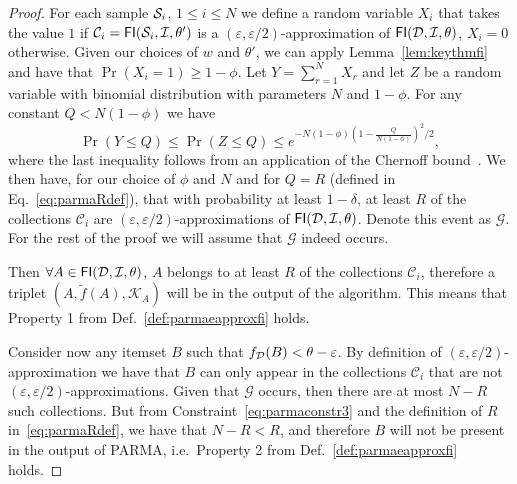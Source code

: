 \begin{proof}
  For each sample ${\cal S}_i$, $1\le i\le N$ we define a random variable $X_i$ that
  takes the value $1$ if $\mathcal{C}_i=\mathsf{FI}({\cal S}_i,{\cal I},\theta')$ is a
  $(\varepsilon,\varepsilon/2)$-approximation of $\mathsf{FI}({\cal D},{\cal I},\theta)$, $X_i=0$
  otherwise. Given our choices of $w$ and $\theta'$, we can apply
  Lemma~\ref{lem:keythmfi} and have that $\Pr(X_i=1)\ge 1-\phi$. Let
  $Y=\sum_{r=1}^N X_r$ and let $Z$ be a random variable with binomial
  distribution with parameters $N$ and $1-\phi$. For any constant $Q<N(1-\phi)$ we have
  \[
  \Pr(Y\le Q)\le\Pr(Z\le Q)\le e^{-N(1-\phi)(1-\frac{Q}{N(1-\phi)})^2/2},
  \]
  where the last inequality follows from an application of the Chernoff
  bound~\cite[Chap.~4]{MitzenmacherU05}.
  We then have, for our choice of $\phi$ and $N$ and for $Q=R$
  (defined in Eq.~\eqref{eq:parmaRdef}), that with probability at least $1-\delta$,
  at least $R$ of the collections $\mathcal{C}_i$ are
  $(\varepsilon,\varepsilon/2)$-approximations of $\mathsf{FI}({\cal D},{\cal I},\theta)$. Denote
  this event as $\mathcal{G}$. For the rest of the proof we will assume that
  $\mathcal{G}$ indeed occurs.

  Then $\forall A\in\mathsf{FI}({\cal D},{\cal I},\theta)$, $A$ belongs to at least $R$ of the
  collections $\mathcal{C}_i$, therefore a triplet
  $(A,\tilde{f}(A),\mathcal{K}_A)$ will be in the output of the algorithm. This
  means that Property 1 from Def.~\ref{def:parmaeapproxfi} holds. 

  Consider now any itemset $B$ such that $f_{\cal D}(B)<\theta-\varepsilon$. By
  definition of $(\varepsilon,\varepsilon/2)$-approximation we have that $B$ can
  only appear in the collections $\mathcal{C}_i$ that are not
  $(\varepsilon,\varepsilon/2)$-approximations. Given
  that $\mathcal{G}$ occurs, then there are at most  $N-R$ such collections. But
  from Constraint~\eqref{eq:parmaconstr3} and the definition of $R$
  in~\eqref{eq:parmaRdef}, we have that $N-R< R$, and therefore $B$ will not be
  present in the output of PARMA, i.e.~Property 2 from Def.~\ref{def:parmaeapproxfi} holds.


\end{proof}
